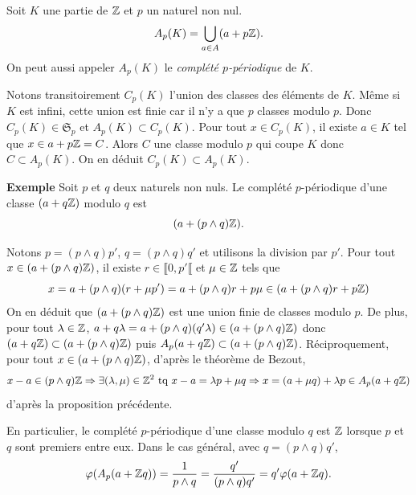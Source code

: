 \begin{propn}
 Soit $K$ une partie de $\mathbb{Z}$ et $p$ un naturel non nul.
 \begin{displaymath}
  A_p(K) = \bigcup_{a\in A}(a + p\mathbb{Z}).
 \end{displaymath}
On peut aussi appeler $A_p(K)$ le \emph{complété $p$-périodique} de $K$.
\end{propn}
\begin{demo}
Notons transitoirement $C_p(K)$ l'union des classes des éléments de $K$. Même si $K$ est infini, cette union est finie car il n'y a que $p$ classes modulo $p$. Donc $C_p(K) \in \mathfrak{S}_p$ et $A_p(K) \subset C_p(K)$.\newline
Pour tout $x \in C_p(K)$, il existe $a \in K$ tel que $x \in a + p\mathbb{Z} = C$. Alors $C$ une classe modulo $p$ qui coupe $K$ donc $C \subset A_p(K)$. On en déduit $C_p(K) \subset A_p(K)$.
\end{demo}

\textbf{Exemple}
Soit $p$ et $q$ deux naturels non nuls. Le complété $p$-périodique d'une classe $(a + q \mathbb{Z})$ modulo $q$ est $$(a + (p\wedge q) \mathbb{Z}).$$
\begin{demo}
 Notons $p = (p\wedge q)p'$, $q = (p\wedge q)q'$ et utilisons la division par $p'$.\newline
 Pour tout $x\in (a + (p\wedge q) \mathbb{Z})$, il existe $r \in \llbracket 0, p' \llbracket$ et $\mu \in \mathbb{Z}$ tels que
 \begin{displaymath}
  x = a + (p\wedge q)(r + \mu p') = a + (p\wedge q)r + p \mu \in (a + (p\wedge q)r + p \mathbb{Z})
 \end{displaymath}
On en déduit que $(a + (p\wedge q) \mathbb{Z})$ est une union finie de classes modulo $p$. De plus, pour tout $\lambda \in \mathbb{Z}$,\newline
$a+q\lambda = a + (p\wedge q) (q'\lambda) \in (a + (p\wedge q) \mathbb{Z})$ donc $(a+q\mathbb{Z})\subset (a+(p\wedge q)\mathbb{Z})$ puis $A_p(a+q\mathbb{Z}) \subset (a+(p\wedge q)\mathbb{Z})$.\newline
Réciproquement, pour tout $x \in (a+(p\wedge q)\mathbb{Z})$, d'après le théorème de Bezout,
\begin{displaymath}
 x-a \in (p\wedge q)\mathbb{Z} \Rightarrow \exists (\lambda, \mu) \in \mathbb{Z}^2 \text{ tq } x-a = \lambda p + \mu q
 \Rightarrow x = (a + \mu q) + \lambda p \in A_p(a + q\mathbb{Z})
\end{displaymath}
d'après la proposition précédente.
\end{demo}
En particulier, le complété $p$-périodique d'une classe modulo $q$ est $\mathbb{Z}$ lorsque $p$ et $q$ sont premiers entre eux. Dans le cas général, avec $q = (p\wedge q) q'$,
\begin{displaymath}
 \varphi(A_p(a+\mathbb{Z} q)) = \frac{1}{p \wedge q} = \frac{q'}{(p \wedge q)q'} = q' \varphi(a+\mathbb{Z} q).
\end{displaymath}

